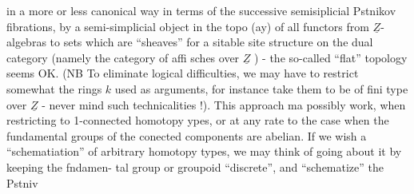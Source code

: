 in a more or less canonical way in terms of the successive semisiplicial
Pstnikov fibrations, by a semi-simplicial object in the topo (ay) of
all functors from $\underline{Z}$-algebras to sets which are ``sheaves'' for a sitable
site structure on the dual category (namely the category of affi
sches over $\underline{Z}$ ) - the so-called ``flat'' topology seems  OK. (NB To
eliminate logical difficulties, we may have to restrict somewhat the
rings $k$ used as arguments, for instance take them to be of fini type
over $\underline{Z}$ - never mind such technicalities !). This approach  ma
possibly work, when restricting to  1-connected homotopy ypes,
or at any rate to the case when the fundamental groups of the conected
\margin{*} components are abelian. If we wish a ``schematiation'' of arbitrary
homotopy types, we may think of going about it by keeping the fndamen-%
tal group or groupoid ``discrete'', and ``schematize'' the Pstniv

